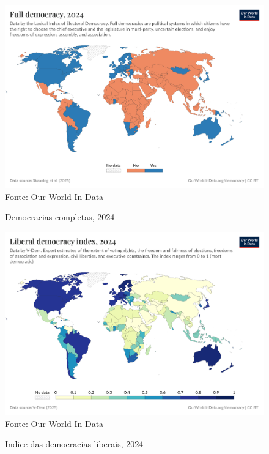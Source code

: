 \begin{figure}[ht]
    \centering
    \caption{Democracias completas, 2024}
    \includegraphics[width=1\linewidth]{figuras/democracia/full-democracy-lexical.png}
    \label{fig:full-democracy-lexical}
    \footnotesize{Fonte: Our World In Data}
\end{figure}

\begin{figure}[ht]
    \centering
    \caption{Indice das democracias liberais, 2024}
    \includegraphics[width=1\linewidth]{figuras/democracia/liberal-democracy-index.png}
    \label{fig:liberal-democracy-index}
    \footnotesize{Fonte: Our World In Data}
\end{figure}

